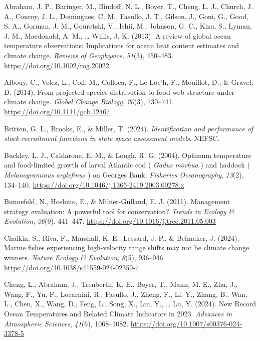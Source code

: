 \documentclass[
  12pt,
]{article}
\newlength{\cslhangindent}
\newenvironment{CSLReferences}[2] %
 {\begin{list}{}{%
  \setlength{\itemindent}{0pt}
  \setlength{\leftmargin}{0pt}
  \setlength{\parsep}{0pt}
  \ifodd #1
   \setlength{\leftmargin}{\cslhangindent}
   \setlength{\itemindent}{-1\cslhangindent}
  \fi
  \setlength{\itemsep}{#2\baselineskip}}}
 {\end{list}}
\begin{document}
\label{refs}
\begin{CSLReferences}{1}{2}
Abraham, J. P., Baringer, M., Bindoff, N. L., Boyer, T., Cheng, L. J., Church, J. A., Conroy, J. L., Domingues, C. M., Fasullo, J. T., Gilson, J., Goni, G., Good, S. A., Gorman, J. M., Gouretski, V., Ishii, M., Johnson, G. C., Kizu, S., Lyman, J. M., Macdonald, A. M., \ldots{} Willis, J. K. (2013). A review of global ocean temperature observations: Implications for ocean heat content estimates and climate change. \emph{Reviews of Geophysics}, \emph{51}(3), 450--483. \url{https://doi.org/10.1002/rog.20022}

Albouy, C., Velez, L., Coll, M., Colloca, F., Le Loc'h, F., Mouillot, D., \& Gravel, D. (2014). From projected species distribution to food{-}web structure under climate change. \emph{Global Change Biology}, \emph{20}(3), 730--741. \url{https://doi.org/10.1111/gcb.12467}

Britten, G. L., Brooks, E., \& Miller, T. (2024). \emph{Identification and performance of stock-recruitment functions in state space assessment models}. NEFSC.

Buckley, L. J., Caldarone, E. M., \& Lough, R. G. (2004). Optimum temperature and food{-}limited growth of larval Atlantic cod ( {\emph{Gadus morhua}} ) and haddock ( {\emph{Melanogrammus aeglefinus}} ) on Georges Bank. \emph{Fisheries Oceanography}, \emph{13}(2), 134--140. \url{https://doi.org/10.1046/j.1365-2419.2003.00278.x}

Bunnefeld, N., Hoshino, E., \& Milner-Gulland, E. J. (2011). Management strategy evaluation: A powerful tool for conservation? \emph{Trends in Ecology \& Evolution}, \emph{26}(9), 441--447. \url{https://doi.org/10.1016/j.tree.2011.05.003}

Chaikin, S., Riva, F., Marshall, K. E., Lessard, J.-P., \& Belmaker, J. (2024). Marine fishes experiencing high-velocity range shifts may not be climate change winners. \emph{Nature Ecology \& Evolution}, \emph{8}(5), 936--946. \url{https://doi.org/10.1038/s41559-024-02350-7}

Cheng, L., Abraham, J., Trenberth, K. E., Boyer, T., Mann, M. E., Zhu, J., Wang, F., Yu, F., Locarnini, R., Fasullo, J., Zheng, F., Li, Y., Zhang, B., Wan, L., Chen, X., Wang, D., Feng, L., Song, X., Liu, Y., \ldots{} Lu, Y. (2024). New Record Ocean Temperatures and Related Climate Indicators in 2023. \emph{Advances in Atmospheric Sciences}, \emph{41}(6), 1068--1082. \url{https://doi.org/10.1007/s00376-024-3378-5}


\end{CSLReferences}
\end{document}
